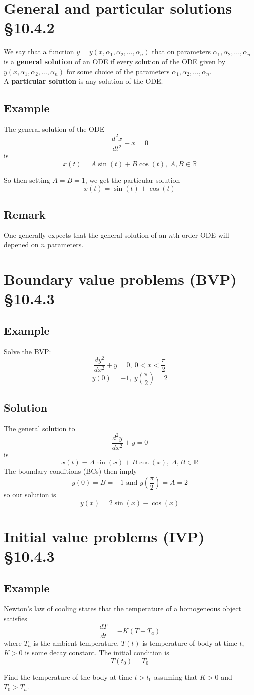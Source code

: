 \documentclass[11pt]{article}
\newcommand{\reals}{\mathbb{R}}
\begin{document}
\section{General and particular solutions §10.4.2}
We say that a function $y=y(x, \alpha_1, \alpha_2, ..., \alpha_n)$ that on parameters $\alpha_1, \alpha_2, ..., \alpha_n$ is a \textbf{general solution} of an ODE if every solution of the ODE given by $y(x, \alpha_1, \alpha_2, ..., \alpha_n)$ for some choice of the parameters $\alpha_1, \alpha_2, ..., \alpha_n$.\\
A \textbf{particular solution} is any solution of the ODE.

\subsection{Example}
The general solution of the ODE
\[ \frac{d^2x}{dt^2} + x = 0 \]
is
\[ x(t) = A\sin(t) + B\cos(t),\ A, B \in \reals \]

So then setting $A = B = 1$, we get the particular solution
\[ x(t) = \sin(t) + \cos(t) \]

\subsection{Remark}
One generally expects that the general solution of an $n$th order ODE will depened on $n$ parameters.

\section{Boundary value problems (BVP) §10.4.3}
\subsection{Example}
Solve the BVP:
\[ \frac{dy^2}{dx^2} + y = 0,\ 0 < x < \frac{\pi}{2} \]
\[ y(0) = -1,\ y \left(\frac{\pi}{2} \right) = 2 \]

\subsection{Solution}
The general solution to
\[ \frac{d^2y}{dx^2} + y = 0 \]
is
\[ x(t) = A\sin(x) + B\cos(x),\ A, B \in \reals \]
The boundary conditions (BCs) then imply
\[ y(0) = B = -1 \text{ and } y\left(\frac{\pi}{2}\right) = A=2\]
so our solution is
\[ y(x) = 2\sin(x) - \cos(x) \]

\section{Initial value problems (IVP) §10.4.3}
\subsection{Example}
Newton's law of cooling states that the temperature of a homogeneous object satisfies
\[ \frac{dT}{dt} = -K(T - T_a) \]
where $T_a$ is the ambient temperature, $T(t)$ is temperature of body at time $t$, $K > 0$ is some decay constant. The initial condition is
\[ T(t_0) = T_0 \]

Find the temperature of the body at time $t > t_0$ assuming that $K > 0$ and $T_0 > T_a$.
\end{document}
